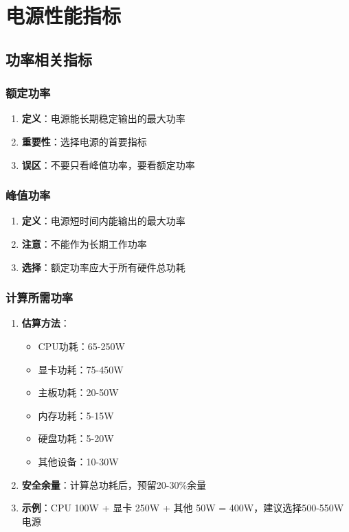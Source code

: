 \documentclass[12pt,UTF8]{ctexbook}
\begin{document}
\part{电源性能指标}

\chapter{功率相关指标}

\section{额定功率}

\begin{enumerate}
    \item \textbf{定义}：电源能长期稳定输出的最大功率
    \item \textbf{重要性}：选择电源的首要指标
    \item \textbf{误区}：不要只看峰值功率，要看额定功率
\end{enumerate}

\section{峰值功率}

\begin{enumerate}
    \item \textbf{定义}：电源短时间内能输出的最大功率
    \item \textbf{注意}：不能作为长期工作功率
    \item \textbf{选择}：额定功率应大于所有硬件总功耗
\end{enumerate}

\section{计算所需功率}

\begin{enumerate}
    \item \textbf{估算方法}：
    \begin{itemize}[leftmargin=2em]
        \item CPU功耗：65-250W
        \item 显卡功耗：75-450W
        \item 主板功耗：20-50W
        \item 内存功耗：5-15W
        \item 硬盘功耗：5-20W
        \item 其他设备：10-30W
    \end{itemize}
    
    \item \textbf{安全余量}：计算总功耗后，预留20-30\%余量
    \item \textbf{示例}：CPU 100W + 显卡 250W + 其他 50W = 400W，建议选择500-550W电源
\end{enumerate}
\end{document}
